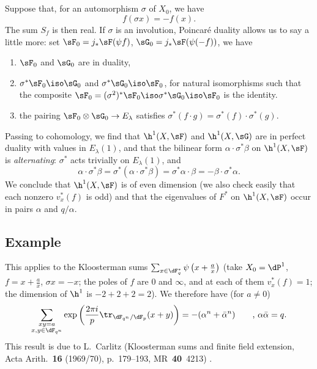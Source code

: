 \subsection{}\label{VI:3-6}

Suppose that, for an automorphism $\sigma$ of $X_0$, we have 
\[
  f(\sigma x) = - f(x) \text{.} 
\]
The sum $S_f$ is then real. If $\sigma$ is an involution, Poincaré 
duality allows us to say a little more: set 
$\sF_0=j_\ast \sF(\psi f)$, $\sG_0 = j_\ast \sF(\psi(-f))$, we have 
\begin{enumerate}[\indent a)]
  \item $\sF_0$ and $\sG_0$ are in duality, 
  \item $\sigma^\ast \sF_0 \iso \sG_0$ and $\sigma^\ast \sG_0 \iso \sF_0$, for 
    natural isomorphisms such that the composite 
    $\sF_0=(\sigma^2)^\ast \sF_0 \iso \sigma^\ast \sG_0 \iso \sF_0$ 
    is the identity. 
  \item the pairing $\sF_0\otimes \sG_0 \to E_\lambda$ satisfies 
    $\sigma^\ast(f\cdot g) = \sigma^\ast(f) \cdot \sigma^\ast (g)$. 
\end{enumerate} 

Passing to cohomology, we find that $\h^1(X,\sF)$ and $\h^1(X,\sG)$ are in 
perfect duality with values in $E_\lambda(1)$, and that the bilinear form 
$\alpha\cdot \sigma^\ast\beta$ on $\h^1(X,\sF)$ is \emph{alternating}: 
$\sigma^\ast$ acts trivially on $E_\lambda(1)$, and 
\[
  \alpha\cdot \sigma^\ast \beta = \sigma^\ast(\alpha\cdot \sigma^\ast \beta) = \sigma^\ast \alpha\cdot \beta = -\beta\cdot \sigma^\ast \alpha \text{.} 
\]
We conclude that $\h^1(X,\sF)$ is of even dimension (we also check 
    easily that each nonzero $v_x^\ast(f)$ is odd) and that the 
eigenvalues of $F^\ast$ on $\h^1(X,\sF)$ occur in pairs $\alpha$ and 
$q/\alpha$. 





\subsection{Example}\label{VI:3-7}

This applies to the Kloosterman sums 
$\sum_{x\in \dF_q^\ast} \psi\left(x+\frac a x\right)$ (take 
$X_0=\dP^1$, $f=x+\frac a x$, $\sigma x=-x$; the poles of $f$ are $0$ and 
$\infty$, and at each of them $v_x^\ast(f)=1$; the dimension of $\h^1$ is 
$-2+2+2=2$). We therefore have (for $a\ne 0$) 
\[
  \sum_{\substack{x y=a \\ x,y\in \dF_{q^n}}} \exp\left(\frac{2\pi i}{p} \tr_{\dF_{q^n}/\dF_p}(x+y)\right) = -(\alpha^n+\bar\alpha^n) \qquad \text{, }\alpha\bar \alpha = q \text{.} 
\]
This result is due to L.\ Carlitz (Kloosterman sums and finite field extension, Acta Arith.~\textbf{16} (1969/70), p.~179--193, MR~\textbf{40}~4213) \cite{ca69}. 

